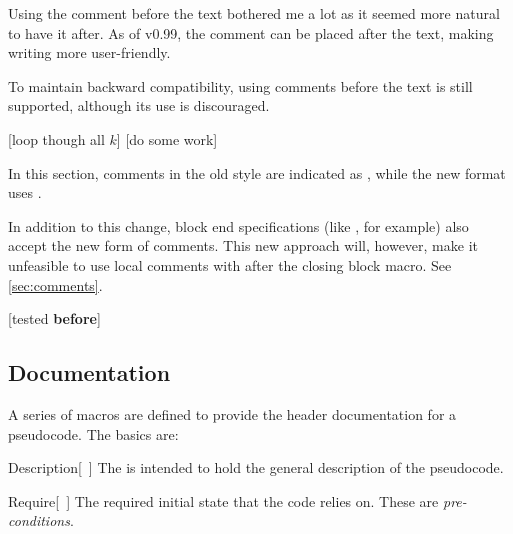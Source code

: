 \documentclass[a4paper, 11pt]{article}
\begin{document}
Using the comment before the text bothered me a lot as it seemed more natural to have it after. As of v0.99, the comment can be placed after the text, making writing more user-friendly.

To maintain backward compatibility, using comments before the text is still supported, although its use is discouraged.

\begin{tcblisting}{}
    \begin{algorithmic}
        [loop though all $k$]
            [do some work]
        \EndWhile
    \end{algorithmic}
\end{tcblisting}

In this section, comments in the old style are indicated as , while the new format uses .

In addition to this change, block end specifications (like , for example) also accept the new form of comments. This new approach will, however, make it unfeasible to use local comments with  after the closing block macro. See \cref{sec:comments}.

\begin{tcblisting}{}
    \begin{algorithmic}
        [tested \textbf{before}]
    \end{algorithmic}
\end{tcblisting}

\subsection{Documentation}
A series of macros are defined to provide the header documentation for a pseudocode. The basics are:
\begin{macro}{Description}[~]
    The  is intended to hold the general description of the pseudocode.
\end{macro}

\begin{macro}{Require}[~]
    The required initial state that the code relies on. These are \textit{pre-conditions}.
\end{macro}
\end{document}
